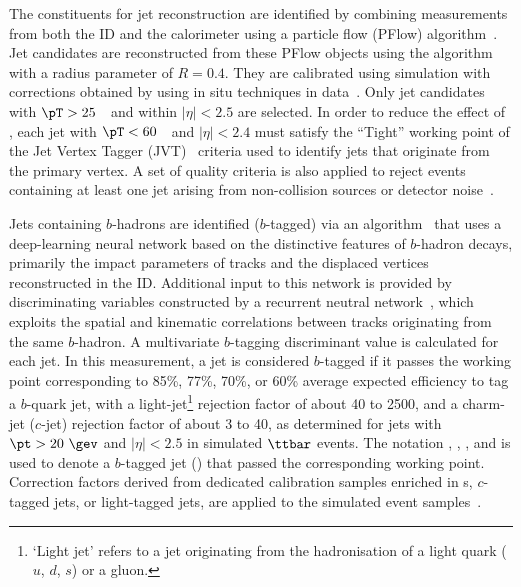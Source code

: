 \documentclass[cernpreprint, atlasdraft=false, texlive=2023, UKenglish, texmf, orcidlogo]{atlasdoc}
\begin{document}
 
The constituents for jet reconstruction are identified by combining measurements from both the ID and the calorimeter using a particle flow (PFlow) algorithm~\cite{PERF-2015-09}. Jet candidates are reconstructed from these PFlow objects using the \antikt algorithm~\cite{Cacciari:2008gp,Cacciari:2011ma} with a radius parameter of $R=0.4$. They are calibrated using simulation with corrections obtained by using in situ techniques in data~\cite{JETM-2018-05}. Only jet candidates with $\pT> 25$~\GeV\ and within $|\eta|<2.5$ are selected. In order to reduce the effect of \pileup, each jet with $\pT<60$~\GeV\ and $|\eta|<2.4$ must satisfy the \enquote{Tight}  working point of the Jet Vertex Tagger (JVT)~\cite{PERF-2014-03} criteria used to identify jets that originate from the primary vertex. A set of quality criteria is also applied to reject events containing at least one jet arising from non-collision sources or detector noise~\cite{ATLAS-CONF-2015-029}.
 
Jets containing $b$-hadrons are identified ($b$-tagged) via an algorithm~\cite{FTAG-2019-07} that uses a deep-learning neural network based on the distinctive features of $b$-hadron decays, primarily the impact parameters of tracks and the displaced vertices reconstructed in the ID. Additional input to this network is provided by discriminating variables constructed by a recurrent neutral network~\cite{ATL-PHYS-PUB-2017-003}, which exploits the spatial and kinematic correlations between tracks originating from the same $b$-hadron. A multivariate $b$-tagging discriminant value is calculated for each jet.
In this measurement, a jet is considered $b$-tagged if it passes the working point corresponding to 85\%, 77\%, 70\%, or 60\% average expected efficiency to tag a $b$-quark jet,
with a light-jet\footnote{`Light jet' refers to a jet originating from the hadronisation of a light quark ($u$, $d$, $s$) or a gluon.} rejection factor of about 40 to 2500, and a charm-jet ($c$-jet) rejection factor of about 3 to 40, as determined for jets with $\pt >20~\gev$ and $|\eta|<2.5$ in simulated $\ttbar$ events.
The notation \bveryloose, \bloose, \bmedium, and \btight is used to denote a $b$-tagged jet (\bjet) that passed the corresponding working point.
Correction factors derived from dedicated calibration samples enriched in \bjet{}s, $c$-tagged jets, or light-tagged jets, are applied to the simulated event samples~\cite{FTAG-2018-01,FTAG-2020-08,FTAG-2019-02}.
 
 
 
\end{document}
